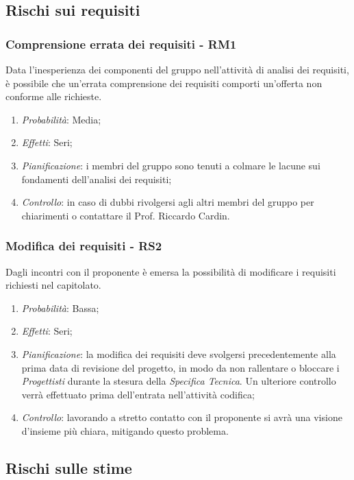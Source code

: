 \subsection{Rischi sui requisiti}
\subsubsection{Comprensione errata dei requisiti - RM1}
Data l'inesperienza dei componenti del gruppo nell'attivit\`a di analisi dei requisiti, \`e possibile che un'errata comprensione dei requisiti comporti un'offerta non conforme alle richieste.
\begin{enumerate}
\item \textit{Probabilit\`a}: Media;
\item \textit{Effetti}: Seri;
\item \textit{Pianificazione}: i membri del gruppo sono tenuti a colmare le lacune sui fondamenti dell'analisi dei requisiti;
\item \textit{Controllo}: in caso di dubbi rivolgersi agli altri membri del gruppo per chiarimenti o contattare il Prof. Riccardo Cardin.
\end{enumerate}

\subsubsection{Modifica dei requisiti - RS2}
Dagli incontri con il proponente \`e emersa la possibilit\`a di modificare i requisiti richiesti nel capitolato.
\begin{enumerate}
\item \textit{Probabilit\`a}: Bassa;
\item \textit{Effetti}: Seri;
\item \textit{Pianificazione}: la modifica dei requisiti deve svolgersi precedentemente alla prima data di revisione del progetto, in modo da non rallentare o bloccare i \textit{Progettisti} durante la stesura della \textit{Specifica Tecnica}. Un ulteriore controllo verr\`a effettuato prima dell'entrata nell'attivit\`a codifica;
\item \textit{Controllo}: lavorando a stretto contatto con il proponente si avr\`a una visione d'insieme pi\`u chiara, mitigando questo problema.
\end{enumerate}

\subsection{Rischi sulle stime}
